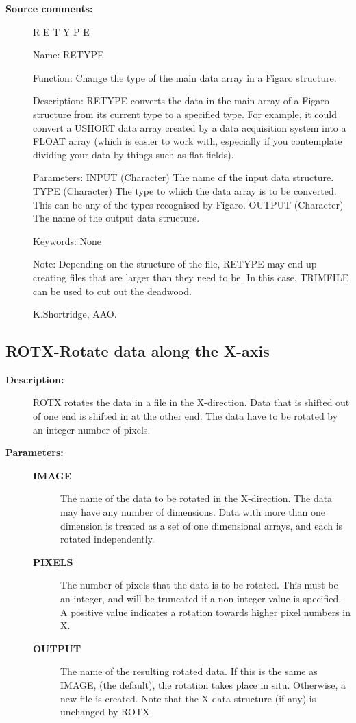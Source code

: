 \begin{description}
\begin{description}
\item [\textbf{Source comments:}]
\begin{terminalv}
 R E T Y P E

 Name:
    RETYPE

 Function:
    Change the type of the main data array in a Figaro structure.

 Description:
    RETYPE converts the data in the main array of a Figaro structure
    from its current type to a specified type.  For example, it could
    convert a USHORT data array created by a data acquisition system
    into a FLOAT array (which is easier to work with, especially if
    you contemplate dividing your data by things such as flat fields).

 Parameters:
    INPUT     (Character) The name of the input data structure.
    TYPE      (Character) The type to which the data array is to be
              converted.  This can be any of the types recognised
              by Figaro.
    OUTPUT    (Character) The name of the output data structure.

 Keywords: None

 Note:
    Depending on the structure of the file, RETYPE may end up creating
    files that are larger than they need to be.  In this case,
    TRIMFILE can be used to cut out the deadwood.

 K.Shortridge, AAO.
\end{terminalv}
\end{description}
\subsection{ROTX-\label{ROTX}Rotate data along the X-axis}
\begin{description}

\item [\textbf{Description:}]
 ROTX rotates the data in a file in the X-direction.  Data that
 is shifted out of one end is shifted in at the other end.  The
 data have to be rotated by an integer number of pixels.

\item [\textbf{Parameters:}]
\begin{description}
\item [\textbf{IMAGE}]
 The name of the data to be rotated in
 the X-direction.  The data may have any number of
 dimensions.  Data with more than one dimension is treated
 as a set of one dimensional arrays, and each is rotated
 independently.
\item [\textbf{PIXELS}]
 The number of pixels that the data is to
 be rotated.  This must be an integer, and will be truncated
 if a non-integer value is specified.  A positive value
 indicates a rotation towards higher pixel numbers in X.
\item [\textbf{OUTPUT}]
 The name of the resulting rotated data.
 If this is the same as IMAGE, (the default), the rotation
 takes place in situ.  Otherwise, a new file is created.
 Note that the X data structure (if any) is unchanged by
 ROTX.
\end{description}


\end{description}
\end{description}
